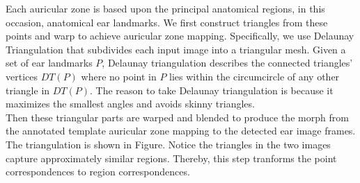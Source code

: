 Each auricular zone is based upon the principal anatomical regions, in this occasion, anatomical ear landmarks. We first construct triangles from these points and warp to achieve auricular zone mapping. Specifically, we use Delaunay Triangulation\cite{lee1980two} that subdivides each input image into a triangular mesh. Given a set of ear landmarks $P$, Delaunay triangulation describes the connected triangles' vertices $DT(P)$ where no point in $P$ lies within the circumcircle of any other triangle in $DT(P)$. The reason to take Delaunay triangulation is because it maximizes the smallest angles and avoids skinny triangles\cite{mount2002cmsc}. \\
Then these triangular parts are warped and blended to produce the morph from the annotated template auricular zone mapping to the detected ear image frames. The triangulation is shown in Figure. Notice the triangles in the two images capture approximately similar regions. Thereby, this step tranforms the point correspondences to region correspondences.
